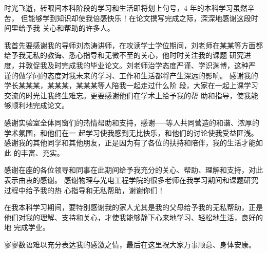 \begin{thanksfor}
	
时光飞逝，转眼间本科阶段的学习和生活即将划上句号，4 年的本科学习虽然辛苦，
但能够学到知识却使我倍感快乐！在论文撰写完成之际，深深地感谢这段时间里给予我
关心和帮助的许多人。 

我首先要感谢我的导师刘杰涛讲师，在攻读学士学位期间，刘老师在某某等方面都给予我无私的教诲、悉心指导和无微不至的关心，他时时关注我的课题
研究进度，并敦促我及时完成我的毕业论文。刘老师治学态度严谨、学识渊博，这种严
谨的做学问的态度对我未来的学习、工作和生活都将产生深远的影响。 
感谢我的学长某某某，某某某，某某某等人陪我一起走过什么阶
段，大家在一起上课学习交流的时光让我终生难忘。更要感谢他们在学术上给予我的帮
助和指导，使我能够顺利地完成论文。 

感谢实验室全体同窗们的热情帮助和支持，感谢-----等人共同营造的和谐、浓厚的学术氛围，和他们在一
起学习使我感到无比快乐，和他们的讨论使我受益匪浅。 
感谢我的其他同学和其他朋友，正是因为有了各位的扶持和陪伴，我的生活才能如此
的丰富、充实。 

感谢在座的各位领导和同事在此期间给予我充分的关心、帮助、理解和支持，对此表示由衷的感谢。
感谢物理与光电工程学院的很多老师在我学习期间和课题研究过程中给予我的热
心指导和无私帮助，谢谢你们！ 

在我本科学习期间，要特别感谢我的家人尤其是我的父母给予我的无私帮助，正是他们对我的理解、支持和关心，才使我能够静下心来地学习、轻松地生活，良好的地
完成学业。 

寥寥数语难以充分表达我的感激之情，最后在这里祝大家万事顺意、身体安康。 

\end{thanksfor}